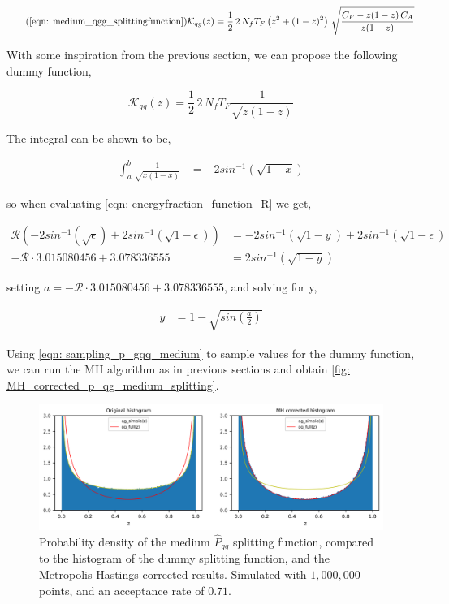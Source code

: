 \documentclass[main.tex]{subfiles}
\begin{document}
\begin{equation}\tag{\ref{eqn: medium_qgg_splittingfunction}}
    \mathcal{K}_{qg}(z) = \frac{1}{2} \, 2\, N_f T_F \left(z^2 + (1-z)^2 \right) \, \sqrt{\frac{C_F - z(1-z) \, C_A}{z(1-z)}}
\end{equation}

With some inspiration from the previous section, we can propose the following dummy function,

\begin{equation}
    \mathcal{K}_{qg}(z) = \frac{1}{2} \, 2\, N_f T_F \frac{1}{\sqrt{z (1-z)}}
\end{equation}

The integral can be shown to be, 

\begin{align}
    \int_a^b \frac{1}{\sqrt{x(1-x)} } &= -2 sin^{-1}(\sqrt{1-x})
\end{align}

so when evaluating \autoref{eqn: energyfraction_function_R} we get,

\begin{align}
    \mathcal{R}\left( -2 sin^{-1}(\sqrt{\epsilon}) + 2 sin^{-1}(\sqrt{1-\epsilon})  \right) &= -2 sin^{-1}(\sqrt{1-y}) + 2 sin^{-1}(\sqrt{1-\epsilon}) \nonumber\\
    -\mathcal{R} \cdot 3.015080456 + 3.078336555 &= 2 sin^{-1}(\sqrt{1-y}) 
\end{align}

setting \(a = -\mathcal{R} \cdot 3.015080456 + 3.078336555\), and solving for y, 

\begin{align}\label{eqn: sampling_p_gqq_medium}
    y &= 1- \sqrt{sin\left(\frac{a}{2}\right)}
\end{align}

Using \autoref{eqn: sampling_p_gqq_medium} to sample values for the dummy function, we can run the MH algorithm as in previous sections and obtain \autoref{fig: MH_corrected_p_qg_medium_splitting}.

\begin{figure}[ht]
    \centering
    \includegraphics[width=14cm]{pictures/MH_plots/MH_medium_qg.png}
    \caption{Probability density of the medium \(\hat{P}_{qg}\) splitting function, compared to the histogram of the dummy splitting function, and the Metropolis-Hastings corrected results. Simulated with \(1,000,000\) points, and an acceptance rate of \(0.71\).}
    \label{fig: MH_corrected_p_qg_medium_splitting}
\end{figure}
\end{document}
